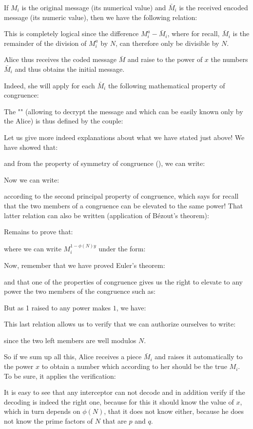 	If $M_i$ is the original message (its numerical value) and $\bar{M}_i$ is the received encoded message (its numeric value), then we have the following relation:
	
	This is completely logical since the difference $M_i^a-\bar{M}_i$, where for recall, $\bar{M}_i$ is the remainder of the division of $M_i^a$ by $N$, can therefore only be divisible by $N$.
	
	Alice thus receives the coded message $\bar{M}$ and raise to the power of $x$ the numbers $\bar{M}_i$ and thus obtains the initial message.

	Indeed, she will apply for each $\bar{M}_i$ the following mathematical property of congruence:
	
	The "" (allowing to decrypt the message and which can be easily known only by the Alice) is thus defined by the couple:
	
	Let us give more indeed explanations about what we have stated just above! We have showed that:
	
	and from the property of symmetry of congruence (), we can write:
	
	Now we can write:
	
	according to the second principal property of congruence, which says for recall that the two members of a congruence can be elevated to the same power! That latter relation can also be written (application of Bézout's theorem):
	
	Remains to prove that:
	
	where we can write $M_i^{1-\phi(N)y}$ under the form:
	
	Now, remember that we have proved Euler's theorem:
	
	and that one of the properties of congruence gives us the right to elevate to any power the two members of the congruence such as:
	
	But as 1 raised to any power makes $1$, we have:
	
	This last relation allows us to verify that we can authorize ourselves to write:
	
	since the two left members are well modulos $N$. 
	
	So if we sum up all this, Alice receives a piece $\bar{M}_i$ and raises it automatically to the power $x$ to obtain a number which according to her should be the true $M_i$. To be sure, it applies the verification:
	
	It is easy to see that any interceptor can not decode and in addition verify if the decoding is indeed the right one, because for this it should know the value of $x$, which in turn depends on $\phi(N)$, that it does not know either, because he does not know the prime factors of $N$ that are $p$ and $q$.

